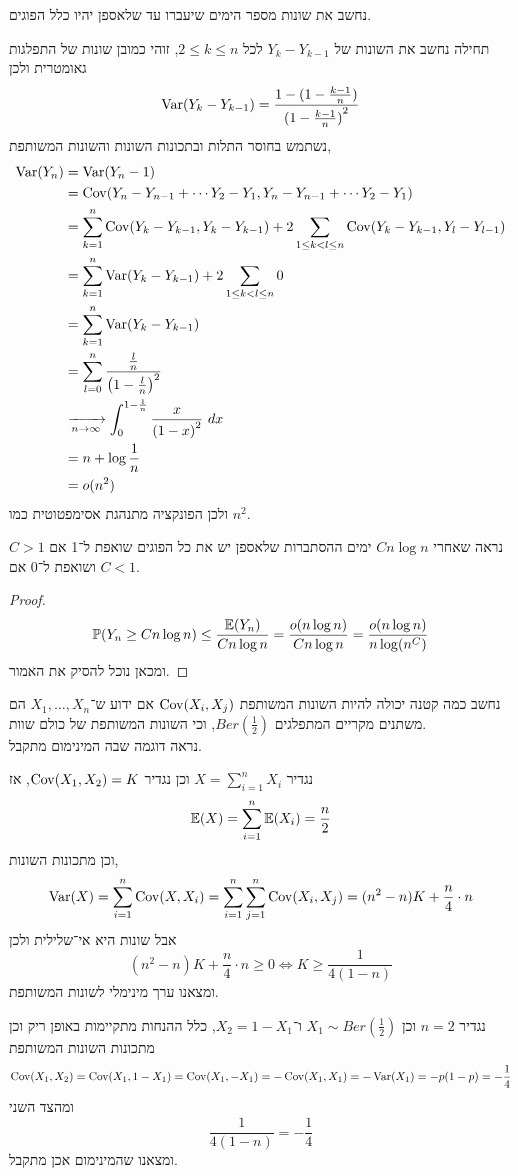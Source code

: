 \subquestion{}
נחשב את שונות מספר הימים שיעברו עד שלאספן יהיו כלל הפוגים.
\begin{solution}
	תחילה נחשב את השונות של $Y_k - Y_{k - 1}$ לכל $2 \le k \le n$, זוהי כמובן שונות של התפלגות גאומטרית ולכן
	\[
		\operatorname{Var}(Y_k - Y_{k - 1})
		= \frac{1 - (1 - \frac{k - 1}{n})}{{(1 - \frac{k - 1}{n})}^2}
	\]
	נשתמש בחוסר התלות ובתכונות השונות והשונות המשותפת,
	\begin{align*}
		\operatorname{Var}(Y_n)
		& = \operatorname{Var}(Y_n - 1) \\
		& = \operatorname{Cov}(Y_n - Y_{n - 1} + \cdots Y_2 - Y_1, Y_n - Y_{n - 1} + \cdots Y_2 - Y_1) \\
		& = \sum_{k = 1}^{n} \operatorname{Cov}(Y_k - Y_{k - 1}, Y_k - Y_{k - 1}) + 2\sum_{1 \le k < l \le n} \operatorname{Cov}(Y_k - Y_{k - 1}, Y_l - Y_{l - 1}) \\
		& = \sum_{k = 1}^{n} \operatorname{Var}(Y_k - Y_{k - 1}) + 2\sum_{1 \le k < l \le n} 0 \\
		& = \sum_{k = 1}^{n} \operatorname{Var}(Y_k - Y_{k - 1}) \\
		& = \sum_{l = 0}^{n} \frac{\frac{l}{n}}{{\left(1 - \frac{l}{n}\right)}^2} \\
		& \xrightarrow[n \to \infty]{} \int_0^{1 - \frac{1}{n}} \frac{x}{{(1 - x)}^2}\ dx \\
		& = n + \log \frac{1}{n} \\
		& = o(n^2)
	\end{align*}
	ולכן הפונקציה מתנהגת אסימפטוטית כמו $n^2$.
\end{solution}

\subquestion{}
נראה שאחרי $C n \log n$ ימים ההסתברות שלאספן יש את כל הפוגים שואפת ל־1 אם $C > 1$ ושואפת ל־$0$ אם $C < 1$.
\begin{proof}
	\[
		\mathbb{P}(Y_n \ge C n \log n)
		\le \frac{\mathbb{E}(Y_n)}{C n \log n}
		= \frac{o(n \log n)}{C n \log n}
		= \frac{o(n \log n)}{n \log(n^C)}
	\]
	ומכאן נוכל להסיק את האמור.
\end{proof}

\question{}
נחשב כמה קטנה יכולה להיות השונות המשותפת $\operatorname{Cov}(X_i, X_j)$ אם ידוע ש־$X_1, \dots, X_n$ הם משתנים מקריים המתפלגים $Ber(\frac{1}{2})$, וכי השונות המשותפת של כולם שוות. \\
נראה דוגמה שבה המינימום מתקבל.
\begin{solution}
	נגדיר $X = \sum_{i = 1}^{n} X_i$ וכן נגדיר $\operatorname{Cov}(X_1, X_2) = K$, אז
	\[
		\mathbb{E}(X)
		= \sum_{i = 1}^{n} \mathbb{E}(X_i)
		= \frac{n}{2}
	\]
	וכן מתכונות השונות,
	\[
		\operatorname{Var}(X)
		= \sum_{i = 1}^n \operatorname{Cov}(X, X_i)
		= \sum_{i = 1}^n \sum_{j = 1}^n \operatorname{Cov}(X_i, X_j)
		= (n^2 - n) K + \frac{n}{4} \cdot n
	\]
	אבל שונות היא אי־שלילית ולכן
	\[
		(n^2 - n) K + \frac{n}{4} \cdot n \ge 0
		\iff
		K \ge \frac{1}{4(1 - n)}
	\]
	ומצאנו ערך מינימלי לשונות המשותפת.

	נגדיר $n = 2$ וכן $X_1 \sim Ber(\frac{1}{2})$ ו־$X_2 = 1 - X_1$, כלל ההנחות מתקיימות באופן ריק וכן מתכונות השונות המשותפת
	\[
		\operatorname{Cov}(X_1, X_2)
		= \operatorname{Cov}(X_1, 1 - X_1)
		= \operatorname{Cov}(X_1, - X_1)
		= - \operatorname{Cov}(X_1, X_1)
		= - \operatorname{Var}(X_1)
		= - p (1 - p)
		= -\frac{1}{4}
	\]
	ומהצד השני
	\[
		\frac{1}{4(1 - n)}
		= -\frac{1}{4}
	\]
	ומצאנו שהמינימום אכן מתקבל.
\end{solution}


